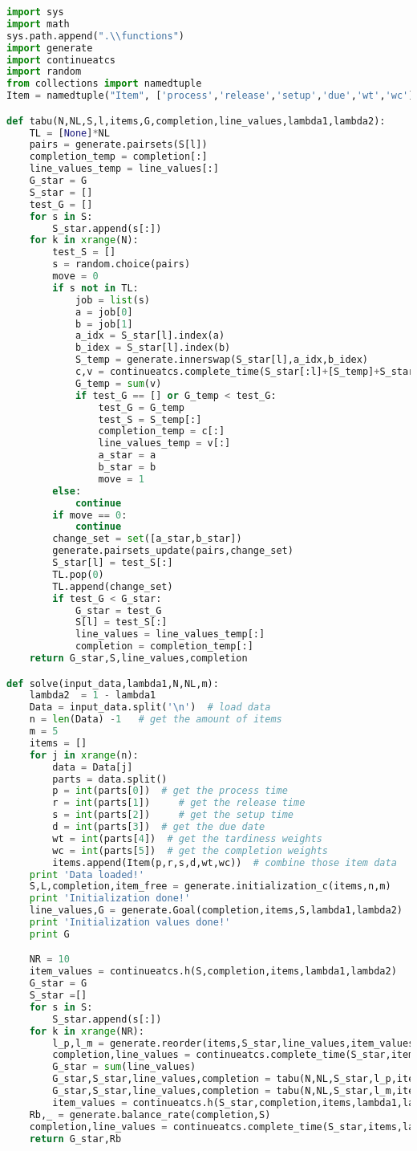 \begin{lstlisting}[language = Python]
import sys
import math
sys.path.append(".\\functions")
import generate
import continueatcs
import random
from collections import namedtuple
Item = namedtuple("Item", ['process','release','setup','due','wt','wc'])

def tabu(N,NL,S,l,items,G,completion,line_values,lambda1,lambda2):
	TL = [None]*NL
	pairs = generate.pairsets(S[l])
	completion_temp = completion[:]
	line_values_temp = line_values[:]
	G_star = G
	S_star = []
	test_G = []
	for s in S:
		S_star.append(s[:])
	for k in xrange(N):
		test_S = []
		s = random.choice(pairs)
		move = 0
		if s not in TL:
			job = list(s)
			a = job[0]
			b = job[1]
			a_idx = S_star[l].index(a)
			b_idex = S_star[l].index(b)
			S_temp = generate.innerswap(S_star[l],a_idx,b_idex)
			c,v = continueatcs.complete_time(S_star[:l]+[S_temp]+S_star[l+1:],items,lambda1,lambda2)
			G_temp = sum(v)
			if test_G == [] or G_temp < test_G:
				test_G = G_temp
				test_S = S_temp[:]
				completion_temp = c[:]
				line_values_temp = v[:]
				a_star = a
				b_star = b
				move = 1
		else:
			continue
		if move == 0:
			continue
		change_set = set([a_star,b_star])
		generate.pairsets_update(pairs,change_set)
		S_star[l] = test_S[:]
		TL.pop(0)
		TL.append(change_set)
		if test_G < G_star:
			G_star = test_G
			S[l] = test_S[:]
			line_values = line_values_temp[:]
			completion = completion_temp[:]
	return G_star,S,line_values,completion

def solve(input_data,lambda1,N,NL,m):
	lambda2  = 1 - lambda1
	Data = input_data.split('\n')  # load data
	n = len(Data) -1   # get the amount of items
	m = 5
	items = []	
	for j in xrange(n):
		data = Data[j]
		parts = data.split()
		p = int(parts[0])  # get the process time
		r = int(parts[1])	  # get the release time
		s = int(parts[2])	  # get the setup time
		d = int(parts[3])  # get the due date
		wt = int(parts[4])  # get the tardiness weights
		wc = int(parts[5])  # get the completion weights
		items.append(Item(p,r,s,d,wt,wc))  # combine those item data
	print 'Data loaded!'	
	S,L,completion,item_free = generate.initialization_c(items,n,m)
	print 'Initialization done!'
	line_values,G = generate.Goal(completion,items,S,lambda1,lambda2)
	print 'Initialization values done!'
	print G

	NR = 10
	item_values = continueatcs.h(S,completion,items,lambda1,lambda2)
	G_star = G
	S_star =[]
	for s in S:
		S_star.append(s[:])
	for k in xrange(NR):
		l_p,l_m = generate.reorder(items,S_star,line_values,item_values)
		completion,line_values = continueatcs.complete_time(S_star,items,lambda1,lambda2)
		G_star = sum(line_values)
		G_star,S_star,line_values,completion = tabu(N,NL,S_star,l_p,items,G_star,completion,line_values,lambda1,lambda2)
		G_star,S_star,line_values,completion = tabu(N,NL,S_star,l_m,items,G_star,completion,line_values,lambda1,lambda2)
		item_values = continueatcs.h(S_star,completion,items,lambda1,lambda2)
	Rb,_ = generate.balance_rate(completion,S)
	completion,line_values = continueatcs.complete_time(S_star,items,lambda1,lambda2)
	return G_star,Rb


\end{lstlisting}
